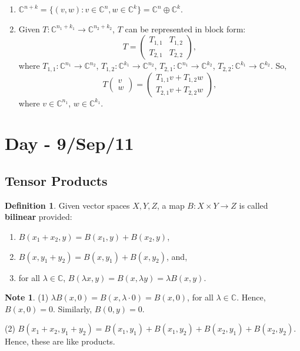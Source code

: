 \documentclass[12pt]{article}
\theoremstyle{definition}
\newtheorem*{definition}{Definition}
\newtheorem*{note}{Note}
\newcommand{\C}{\mathbb{C}}
\begin{document}
\begin{enumerate}
\item $\C^{n+k} = \{(v,w) : v \in \C^n, w \in \C^k\} = \C^n \oplus \C^k$.

\item Given $T : \C^{n_1+k_1} \to \C^{n_2+k_2}$, $T$ can be represented in block form:
\[
T = \begin{pmatrix} T_{1,1} & T_{1,2} \\ T_{2,1} & T_{2,2} \end{pmatrix},
\]
where $T_{1,1} : \C^{n_1} \to \C^{n_2}$, $T_{1,2} : \C^{k_1} \to \C^{n_2}$, $T_{2,1} : \C^{n_1} \to \C^{k_2}$, $T_{2,2} : \C^{k_1} \to \C^{k_2}$. So,
\[
T\begin{pmatrix} v \\ w \end{pmatrix} = \begin{pmatrix} T_{1,1}v + T_{1,2}w \\ T_{2,1}v + T_{2,2}w \end{pmatrix},
\]
where $v \in \C^{n_1}$, $w \in \C^{k_1}$.
\end{enumerate}

\section{Day - 9/Sep/11}

\subsection{Tensor Products}

\begin{definition}
Given vector spaces $X, Y, Z$, a map $B : X \times Y \to Z$ is called \textbf{bilinear} provided:
\begin{enumerate}
\item $B(x_1+x_2, y) = B(x_1,y) + B(x_2,y)$,
\item $B(x, y_1+y_2) = B(x,y_1) + B(x,y_2)$, and,
\item for all $\lambda \in \C$, $B(\lambda x, y) = B(x, \lambda y) = \lambda B(x,y)$.
\end{enumerate}
\end{definition}

\begin{note}
(1) $\lambda B(x,0) = B(x,\lambda \cdot 0) = B(x,0)$, for all $\lambda \in \C$. Hence, $B(x,0) = 0$. Similarly, $B(0,y) = 0$.

(2) $B(x_1+x_2, y_1+y_2) = B(x_1,y_1) + B(x_1,y_2) + B(x_2,y_1) + B(x_2,y_2)$. Hence, these are like products.
\end{note}
\end{document}
